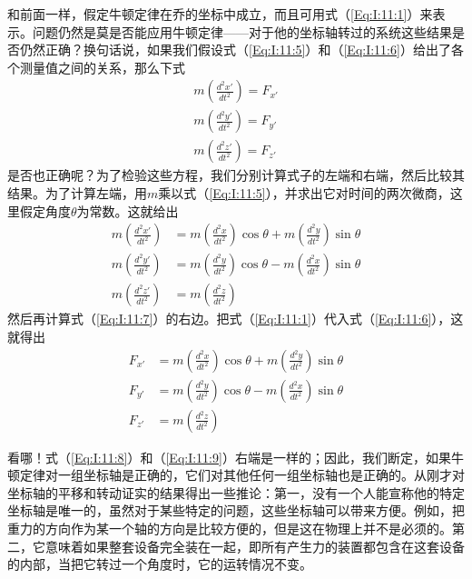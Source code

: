 和前面一样，假定牛顿定律在乔的坐标中成立，而且可用式（\ref{Eq:I:11:1}）来表示。问题仍然是莫是否能应用牛顿定律——对于他的坐标轴转过的系统这些结果是否仍然正确？换句话说，如果我们假设式（\ref{Eq:I:11:5}）和（\ref{Eq:I:11:6}）给出了各个测量值之间的关系，那么下式
\begin{equation}
    \label{Eq:I:11:7}
    \begin{split}
        m(\frac{d^2x'}{dt^2})=F_{x'} \\
        m(\frac{d^2y'}{dt^2})=F_{y'} \\
        m(\frac{d^2z'}{dt^2})=F_{z'}
    \end{split}
\end{equation}
是否也正确呢？为了检验这些方程，我们分别计算式子的左端和右端，然后比较其结果。为了计算左端，用$m$乘以式（\ref{Eq:I:11:5}），并求出它对时间的两次微商，这里假定角度$\theta$为常数。这就给出
\begin{equation}
    \label{Eq:I:11:8}
    \begin{aligned}
        m(\frac{d^2x'}{dt^2})&=m(\frac{d^2x}{dt^2}) \cos \theta + m(\frac{d^2y}{dt^2}) \sin \theta \\
        m(\frac{d^2y'}{dt^2})&=m(\frac{d^2y}{dt^2}) \cos \theta - m(\frac{d^2x}{dt^2}) \sin \theta \\
        m(\frac{d^2z'}{dt^2})&=m(\frac{d^2z}{dt^2})
    \end{aligned}
\end{equation}
然后再计算式（\ref{Eq:I:11:7}）的右边。把式（\ref{Eq:I:11:1}）代入式（\ref{Eq:I:11:6}），这就得出
\begin{equation}
    \label{Eq:I:11:9}
    \begin{aligned}
        F_{x'}&=m(\frac{d^2x}{dt^2}) \cos \theta + m(\frac{d^2y}{dt^2}) \sin \theta \\
        F_{y'}&=m(\frac{d^2y}{dt^2}) \cos \theta - m(\frac{d^2x}{dt^2}) \sin \theta \\
        F_{z'}&=m(\frac{d^2z}{dt^2})
    \end{aligned}
\end{equation}

看哪！式（\ref{Eq:I:11:8}）和（\ref{Eq:I:11:9}）右端是一样的；因此，我们断定，如果牛顿定律对一组坐标轴是正确的，它们对其他任何一组坐标轴也是正确的。从刚才对坐标轴的平移和转动证实的结果得出一些推论：第一，没有一个人能宣称他的特定坐标轴是唯一的，虽然对于某些特定的问题，这些坐标轴可以带来方便。例如，把重力的方向作为某一个轴的方向是比较方便的，但是这在物理上并不是必须的。第二，它意味着如果整套设备完全装在一起，即所有产生力的装置都包含在这套设备的内部，当把它转过一个角度时，它的运转情况不变。

